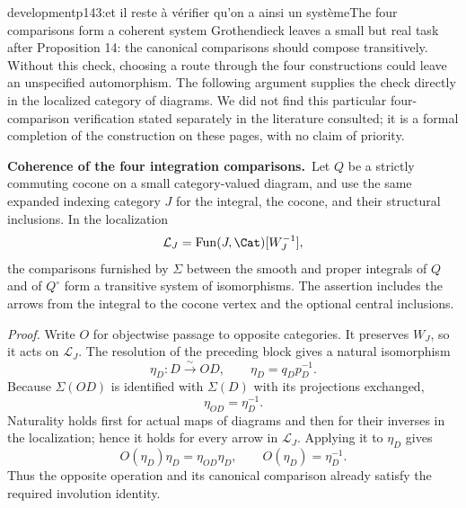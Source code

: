 \begin{dcomment}{development}{p143:et il reste à vérifier qu'on a ainsi un système}{The four comparisons form a coherent system}
Grothendieck leaves a small but real task after Proposition 14: the canonical comparisons should compose transitively. Without this check, choosing a route through the four constructions could leave an unspecified automorphism. The following argument supplies the check directly in the localized category of diagrams. We did not find this particular four-comparison verification stated separately in the literature consulted; it is a formal completion of the construction on these pages, with no claim of priority.

\textbf{Coherence of the four integration comparisons.}\ours\
Let $Q$ be a strictly commuting cocone on a small category-valued diagram, and use the same expanded indexing category $J$ for the integral, the cocone, and their structural inclusions. In the localization
\[
 \mathcal L_J=\operatorname{Fun}(J,\Cat)[W_J^{-1}],
\]
the comparisons furnished by $\Sigma$ between the smooth and proper integrals of $Q$ and of $Q^\circ$ form a transitive system of isomorphisms. The assertion includes the arrows from the integral to the cocone vertex and the optional central inclusions.

\emph{Proof.} Write $O$ for objectwise passage to opposite categories. It preserves $W_J$, so it acts on $\mathcal L_J$. The resolution of the preceding block gives a natural isomorphism
\[
 \eta_D:D\xrightarrow{\sim}OD,
 \qquad \eta_D=q_Dp_D^{-1}.
\]
Because $\Sigma(OD)$ is identified with $\Sigma(D)$ with its projections exchanged,
\[
 \eta_{OD}=\eta_D^{-1}.
\]
Naturality holds first for actual maps of diagrams and then for their inverses in the localization; hence it holds for every arrow in $\mathcal L_J$. Applying it to $\eta_D$ gives
\[
 O(\eta_D)\eta_D=\eta_{OD}\eta_D,
 \qquad O(\eta_D)=\eta_D^{-1}.
\]
Thus the opposite operation and its canonical comparison already satisfy the required involution identity.


\end{dcomment}
